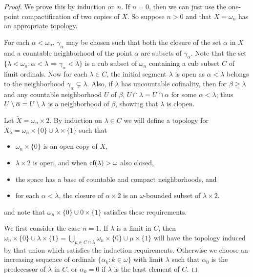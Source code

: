 \documentclass{amsart}
\theoremstyle{plain}
\theoremstyle{definition}
\theoremstyle{remark}
\theoremstyle{plain}
\theoremstyle{definition}
\theoremstyle{remark}
\begin{document}
  \begin{proof}
    We prove this by induction on \(n\).
    If \(n=0\), then we can just use the one-point compactification of two
    copies of \(X\). So suppose \(n>0\) and
    that \(X=\omega_n\) has an appropriate topology.

    For each \(\alpha<\omega_n\), \(\gamma_\alpha\) may be chosen such that
    both the closure of the set \(\alpha\) in \(X\) and a countable
    neighborhood of the point \(\alpha\) are subsets of \(\gamma_\alpha\).
    Note that the set
    \(\{\lambda<\omega_n:\alpha<\lambda\Rightarrow\gamma_\alpha<\lambda\}\)
    is a cub subset of \(\omega_n\) containing a cub subset \(C\)
    of limit ordinals.
    Now for each \(\lambda\in C\), the initial segment \(\lambda\) is
    open as \(\alpha<\lambda\) belongs to the neighborhood
    \(\gamma_\alpha\subsetneq\lambda\). Also, if \(\lambda\) has uncountable
    cofinality, then for \(\beta\geq\lambda\) and any countable neighborhood
    \(U\) of \(\beta\), \(U\cap\lambda=U\cap\alpha\)
    for some \(\alpha<\lambda\); thus \(U\setminus\overline{\alpha}=U\setminus\lambda\)
    is a neighborhood of \(\beta\), showing that \(\lambda\)
    is clopen.

    Let \(\tilde X=\omega_n\times 2\).
    By induction on \(\lambda \in C\) we will define a topology
    for \(\tilde X_\lambda=\omega_n\times\{0\}\cup\lambda\times\{1\}\)
    such that
    \begin{itemize}
      \item \(\omega_n \times \{0\}\) is an open copy of \(X\),
      \item \(\lambda\times 2\) is open, and when \(\textrm{cf}(\lambda)>\omega\) also closed,
      \item the space has a base of countable and compact neighborhoods, and
      \item for each \(\alpha<\lambda\), the closure of \(\alpha\times 2\) is
        an \(\omega\)-bounded  subset of \(\lambda\times 2\).
    \end{itemize}
    and note that \(\omega_n\times\{0\}\cup 0\times\{1\}\) satisfies these
    requirements.

    We first consider the case \(n=1\).
    If \(\lambda\) is a limit in \(C\), then
    \(
      \omega_n\times\{0\}\cup\lambda\times\{1\}
        =
      \bigcup_{\mu\in C\cap\lambda}\omega_n\times\{0\}\cup\mu\times\{1\}
    \)
    will have the topology induced by that union which
    satisfies the induction requirements.
    Otherwise we choose an increasing sequence of
    ordinals \(\{\alpha_k : k\in \omega\}\) with limit \(\lambda\)
    such that \(\alpha_0\) is the predecessor of \(\lambda\) in \(C\),
    or \(\alpha_0=0\) if \(\lambda\) is the least element of \(C\).


\end{proof}
\end{document}
